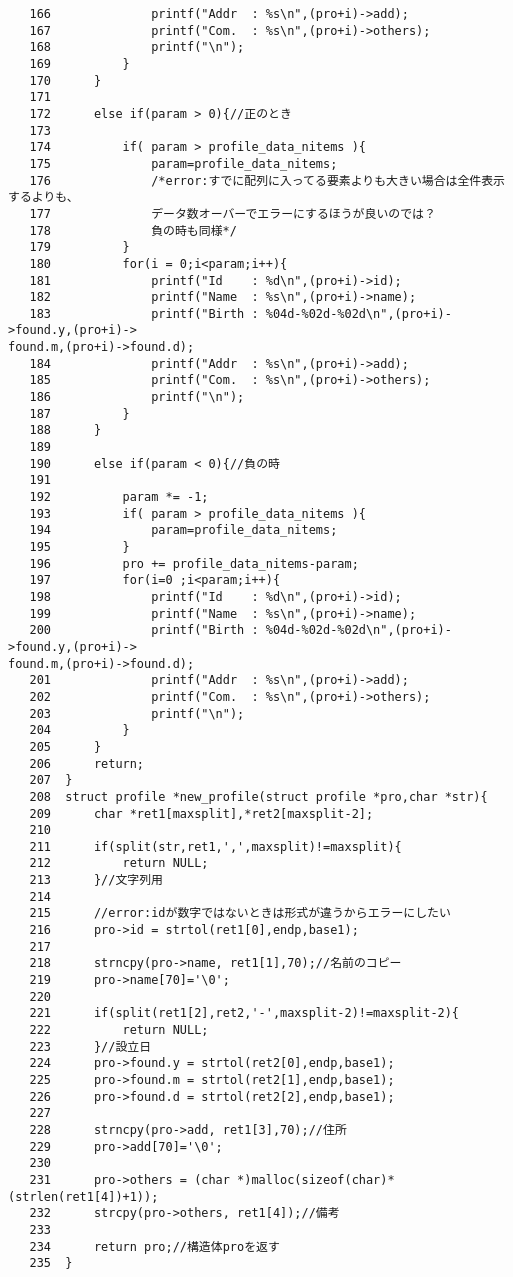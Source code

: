 \documentclass[a4j,11pt]{jarticle}
\begin{document}
{\begin{verbatim}
   166              printf("Addr  : %s\n",(pro+i)->add);
   167              printf("Com.  : %s\n",(pro+i)->others);
   168              printf("\n");
   169          }
   170      }
   171
   172      else if(param > 0){//正のとき
   173
   174          if( param > profile_data_nitems ){
   175              param=profile_data_nitems;
   176              /*error:すでに配列に入ってる要素よりも大きい場合は全件表示するよりも、
   177              データ数オーバーでエラーにするほうが良いのでは？
   178              負の時も同様*/
   179          }
   180          for(i = 0;i<param;i++){
   181              printf("Id    : %d\n",(pro+i)->id);
   182              printf("Name  : %s\n",(pro+i)->name);
   183              printf("Birth : %04d-%02d-%02d\n",(pro+i)->found.y,(pro+i)->
found.m,(pro+i)->found.d);
   184              printf("Addr  : %s\n",(pro+i)->add);
   185              printf("Com.  : %s\n",(pro+i)->others);
   186              printf("\n");
   187          }
   188      }
   189
   190      else if(param < 0){//負の時
   191
   192          param *= -1;
   193          if( param > profile_data_nitems ){
   194              param=profile_data_nitems;
   195          }
   196          pro += profile_data_nitems-param;
   197          for(i=0 ;i<param;i++){
   198              printf("Id    : %d\n",(pro+i)->id);
   199              printf("Name  : %s\n",(pro+i)->name);
   200              printf("Birth : %04d-%02d-%02d\n",(pro+i)->found.y,(pro+i)->
found.m,(pro+i)->found.d);
   201              printf("Addr  : %s\n",(pro+i)->add);
   202              printf("Com.  : %s\n",(pro+i)->others);
   203              printf("\n");
   204          }
   205      }
   206      return;
   207  }
   208  struct profile *new_profile(struct profile *pro,char *str){
   209      char *ret1[maxsplit],*ret2[maxsplit-2];
   210
   211      if(split(str,ret1,',',maxsplit)!=maxsplit){
   212          return NULL;
   213      }//文字列用
   214
   215      //error:idが数字ではないときは形式が違うからエラーにしたい
   216      pro->id = strtol(ret1[0],endp,base1);
   217
   218      strncpy(pro->name, ret1[1],70);//名前のコピー
   219      pro->name[70]='\0';
   220
   221      if(split(ret1[2],ret2,'-',maxsplit-2)!=maxsplit-2){
   222          return NULL;
   223      }//設立日
   224      pro->found.y = strtol(ret2[0],endp,base1);
   225      pro->found.m = strtol(ret2[1],endp,base1);
   226      pro->found.d = strtol(ret2[2],endp,base1);
   227
   228      strncpy(pro->add, ret1[3],70);//住所
   229      pro->add[70]='\0';
   230
   231      pro->others = (char *)malloc(sizeof(char)*(strlen(ret1[4])+1));
   232      strcpy(pro->others, ret1[4]);//備考
   233
   234      return pro;//構造体proを返す
   235  }
\end{verbatim}
}

\end{document}
